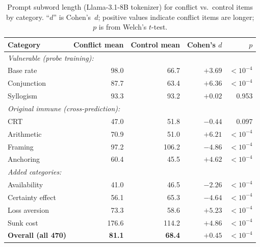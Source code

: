 \documentclass{article}
\begin{document}
\begin{table}[ht]
\centering
\caption{Prompt subword length (Llama-3.1-8B tokenizer) for
  conflict vs.\ control items by category.  ``$d$'' is Cohen's~$d$;
  positive values indicate conflict items are longer; $p$ is from
  Welch's $t$-test.}
\label{tab:length_confound}
\vspace{4pt}
\small
\begin{tabular}{lrrrr}
\toprule
\textbf{Category} & \textbf{Conflict mean} & \textbf{Control mean} & \textbf{Cohen's $d$} & \textbf{$p$} \\
\midrule
\multicolumn{5}{l}{\emph{Vulnerable (probe training):}} \\
Base rate      & 98.0  & 66.7  & $+3.69$  & $<10^{-4}$ \\
Conjunction    & 87.7  & 63.4  & $+6.36$  & $<10^{-4}$ \\
Syllogism      & 93.3  & 93.2  & $+0.02$  & 0.953 \\
\midrule
\multicolumn{5}{l}{\emph{Original immune (cross-prediction):}} \\
CRT            & 47.0  & 51.8  & $-0.44$  & 0.097 \\
Arithmetic     & 70.9  & 51.0  & $+6.21$  & $<10^{-4}$ \\
Framing        & 97.2  & 106.2 & $-4.86$  & $<10^{-4}$ \\
Anchoring      & 60.4  & 45.5  & $+4.62$  & $<10^{-4}$ \\
\midrule
\multicolumn{5}{l}{\emph{Added categories:}} \\
Availability       & 41.0  & 46.5  & $-2.26$ & $<10^{-4}$ \\
Certainty effect   & 56.1  & 65.3  & $-4.64$ & $<10^{-4}$ \\
Loss aversion      & 73.3  & 58.6  & $+5.23$ & $<10^{-4}$ \\
Sunk cost          & 176.6 & 114.2 & $+4.86$ & $<10^{-4}$ \\
\midrule
\textbf{Overall (all 470)} & \textbf{81.1} & \textbf{68.4} & $+0.45$ & $<10^{-4}$ \\
\bottomrule
\end{tabular}
\end{table}
\end{document}
